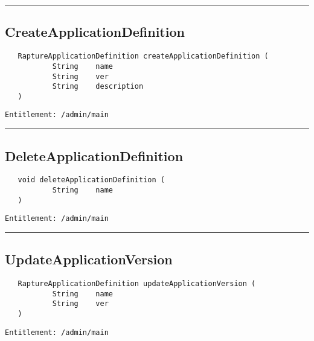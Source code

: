 \rule{12cm}{2pt}
\subsection{CreateApplicationDefinition}
\label{Api:CreateApplicationDefinition}
\begin{Verbatim}
   RaptureApplicationDefinition createApplicationDefinition (
           String    name
           String    ver
           String    description
   )
\end{Verbatim}
\begin{Verbatim}[formatcom=\color{Maroon}]
  Entitlement: /admin/main
\end{Verbatim}



\rule{12cm}{2pt}
\subsection{DeleteApplicationDefinition}
\label{Api:DeleteApplicationDefinition}
\begin{Verbatim}
   void deleteApplicationDefinition (
           String    name
   )
\end{Verbatim}
\begin{Verbatim}[formatcom=\color{Maroon}]
  Entitlement: /admin/main
\end{Verbatim}



\rule{12cm}{2pt}
\subsection{UpdateApplicationVersion}
\label{Api:UpdateApplicationVersion}
\begin{Verbatim}
   RaptureApplicationDefinition updateApplicationVersion (
           String    name
           String    ver
   )
\end{Verbatim}
\begin{Verbatim}[formatcom=\color{Maroon}]
  Entitlement: /admin/main
\end{Verbatim}



